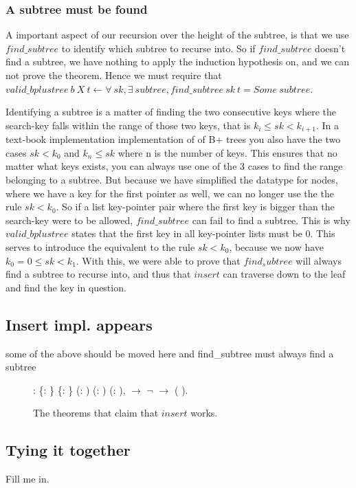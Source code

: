 \subsubsection{A subtree must be found}

A important aspect of our recursion over the height of the subtree, is that we use $find\_subtree$ to identify which subtree to recurse into. So if $find\_subtree$ doesn't find a subtree, we have nothing to apply the induction hypothesis on, and we can not prove the theorem. Hence we must require that
$valid\_bplustree~b~X~t \leftarrow \forall~sk, \exists~subtree, find\_subtree~ sk~t = Some~subtree$.

Identifying a subtree is a matter of finding the two consecutive keys where the search-key falls within the range of those two keys, that is $k_i \le sk < k_{i+1}$. In a text-book implementation implementation of of B+ trees you also have the two cases $sk < k_0$ and $k_{n} \le sk$ where n is the number of keys. This ensures that no matter what keys exists, you can always use one of the 3 cases to find the range belonging to a subtree. But because we have simplified the datatype for nodes, where we have a key for the first pointer as well, we can no longer use the the rule $sk < k_0$. So if a list key-pointer pair where the first key is bigger than the search-key were to be allowed, $find\_subtree$ can fail to find a subtree. This is why $valid\_bplustree$ states that the first key in all key-pointer lists must be 0. This serves to introduce the equivalent to the rule $sk < k_0$, because we now have $k_0 = 0 \le sk < k_1$. With this, we were able to prove that $find_subtree$ will always find a subtree to recurse into, and thus that $insert$ can traverse down to the leaf and find the key in question.

\subsection{Insert impl. appears}
some of the above should be moved here and find\_subtree must always find a subtree

\begin{figure}
  \begin{coqdoccode}
  \coqdocnoindent
    : \coqdockw{\ensuremath{\forall}} \{: \} \{: \} (:   ) (: ) (: ),\coqdoceol
  \coqdocindent{1.00em}
      \ensuremath{\rightarrow} \coqdoceol
  \coqdocindent{1.00em}
  \ensuremath{\lnot}   \ensuremath{\rightarrow} \coqdoceol
  \coqdocindent{1.00em}
     (   ).\coqdoceol
  \end{coqdoccode}
  \caption{The theorems that claim that $insert$ works.}
  \label{fig:insert_works}
\end{figure}

\subsection{Tying it together}
Fill me in.
